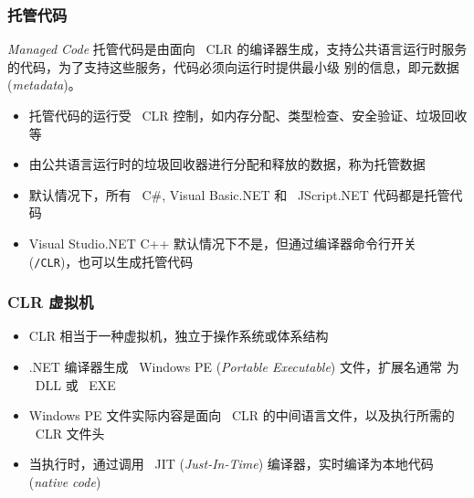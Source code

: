 \begin{frame}
\frametitle{托管代码}

\begin{block}{\textit{Managed Code}}
  \CJKindent 托管代码是由面向 ~CLR 的编译器生成，支持公共语言运行时服务的代码，为了支持这些服务，代码必须向运行时提供最小级
  别的信息，即元数据 (\textit{metadata})。
\end{block}

\begin{itemize}
\item<2-| handout:1> 托管代码的运行受 ~CLR 控制，如内存分配、类型检查、安全验证、垃圾回收等
\item<3-| handout:1> 由公共语言运行时的垃圾回收器进行分配和释放的数据，称为托管数据
\item<4-| handout:1> 默认情况下，所有 ~C\#, Visual Basic.NET 和 ~JScript.NET 代码都是托管代码
\item<5-| handout:1> Visual Studio.NET C++ 默认情况下不是，但通过编译器命令行开关 (\texttt{/CLR})，也可以生成托管代码
\end{itemize}
\end{frame}

\begin{frame}
\frametitle{CLR 虚拟机}
\begin{itemize}
\item<1-| handout:1> CLR 相当于一种虚拟机，独立于操作系统或体系结构
\item<2-| handout:1> .NET 编译器生成 ~Windows PE (\textit{Portable Executable}) 文件，扩展名通常
  为 ~DLL 或 ~EXE
\item<3-| handout:1> Windows PE 文件实际内容是面向 ~CLR 的中间语言文件，以及执行所需的 ~CLR 文件头
\item<4-| handout:1> 当执行时，通过调用 ~JIT (\textit{Just-In-Time}) 编译器，实时编译为本地代码
  (\textit{native code})
\end{itemize}

\begin{figure}[h] 
  \centering 
\end{figure}
\end{frame}


